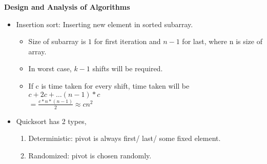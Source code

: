 \documentclass{article}
\begin{document}
\begin{center}
	\LARGE \textbf{Design and Analysis of Algorithms}\\
	\vspace{20pt}
\end{center}
\large
\begin{itemize}
	\item Insertion sort: Inserting new element in sorted subarray. \begin{itemize}
		\item Size of subarray is $1$ for first iteration and $n-1$ for last, where n is size of array.
		\item In worst case, $k-1$ shifts will be required.
		\item If c is time taken for every shift, time taken will be $c + 2c + \dots (n-1)*c$ \\
		$=\frac{c*n*(n-1)}{2} \approx cn^2$
	\end{itemize}
	\item Quicksort has 2 types,\begin{enumerate}
		\item Deterministic: pivot is always first/ last/ some fixed element.
		\item Randomized: pivot is chosen randomly.
	\end{enumerate}
\end{itemize}
\end{document}
